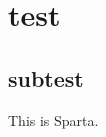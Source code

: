 


    \section{test}

        \subsection{subtest}
        
            \begin{defn}[This] \label{def_this}
                This is Sparta.
            \end{defn}

